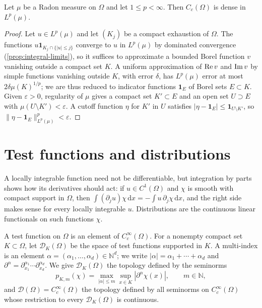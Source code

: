 \begin{proposition}\label{prop:continuous-density}
Let $\mu$ be a Radon measure on $\Omega$ and let $1\leq p<\infty$. Then $C_c(\Omega)$ is dense in $L^p(\mu)$.
\end{proposition}
\begin{proof}
Let $u\in L^p(\mu)$ and let $(K_j)$ be a compact exhaustion of $\Omega$. The functions $u\mathbf1_{K_j\cap\{|u|\leq j\}}$ converge to $u$ in $L^p(\mu)$ by dominated convergence (\cref{prop:integral-limits}), so it suffices to approximate a bounded Borel function $v$ vanishing outside a compact set $K$. A uniform approximation of $\operatorname{Re} v$ and $\operatorname{Im} v$ by simple functions vanishing outside $K$, with error $\delta$, has $L^p(\mu)$ error at most $2\delta\mu(K)^{1/p}$; we are thus reduced to indicator functions $\mathbf1_E$ of Borel sets $E\subset K$. Given $\varepsilon>0$, regularity of $\mu$ gives a compact set $K'\subset E$ and an open set $U\supset E$ with $\mu(U\setminus K')<\varepsilon$. A cutoff function $\eta$ for $K'$ in $U$ satisfies $|\eta-\mathbf1_E|\leq\mathbf1_{U\setminus K'}$, so $\|\eta-\mathbf1_E\|_{L^p(\mu)}^p<\varepsilon$.
\end{proof}

\section{Test functions and distributions}
\label{sec:test-functions}
A locally integrable function need not be differentiable, but integration by parts shows how its derivatives should act: if $u\in C^1(\Omega)$ and $\chi$ is smooth with compact support in $\Omega$, then $\int(\partial_ju)\chi\,\mathrm dx=-\int u\,\partial_j\chi\,\mathrm dx$, and the right side makes sense for every locally integrable $u$. Distributions are the continuous linear functionals on such functions $\chi$.

A test function on $\Omega$ is an element of $C_c^\infty(\Omega)$. For a nonempty compact set $K\subset\Omega$, let $\mathcal D_K(\Omega)$ be the space of test functions supported in $K$. A multi-index is an element $\alpha=(\alpha_1,\ldots,\alpha_d)\in\mathbb N^d$; we write $|\alpha|=\alpha_1+\cdots+\alpha_d$ and $\partial^\alpha=\partial_{x_1}^{\alpha_1}\cdots\partial_{x_d}^{\alpha_d}$. We give $\mathcal D_K(\Omega)$ the topology defined by the seminorms
\[
 p_{K,m}(\chi)=\max_{|\alpha|\leq m}\sup_{x\in K}|\partial^\alpha\chi(x)|,\qquad m\in\mathbb N,
\]
and $\mathcal D(\Omega)=C_c^\infty(\Omega)$ the topology defined by all seminorms on $C_c^\infty(\Omega)$ whose restriction to every $\mathcal D_K(\Omega)$ is continuous.

